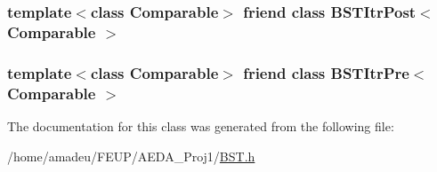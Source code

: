 \subsubsection[{\texorpdfstring{B\+S\+T\+Itr\+Post$<$ Comparable $>$}{BSTItrPost< Comparable >}}]{\setlength{\rightskip}{0pt plus 5cm}template$<$class Comparable$>$ friend class {\bf B\+S\+T\+Itr\+Post}$<$ Comparable $>$\hspace{0.3cm}{\ttfamily [friend]}}\hypertarget{classBST_a5dc153694be266f6e772659486219da7}{}\label{classBST_a5dc153694be266f6e772659486219da7}
\subsubsection[{\texorpdfstring{B\+S\+T\+Itr\+Pre$<$ Comparable $>$}{BSTItrPre< Comparable >}}]{\setlength{\rightskip}{0pt plus 5cm}template$<$class Comparable$>$ friend class {\bf B\+S\+T\+Itr\+Pre}$<$ Comparable $>$\hspace{0.3cm}{\ttfamily [friend]}}\hypertarget{classBST_a45a55df6f11541416d4ea7684c575c1a}{}\label{classBST_a45a55df6f11541416d4ea7684c575c1a}


The documentation for this class was generated from the following file\+:\begin{DoxyCompactItemize}
\item 
/home/amadeu/\+F\+E\+U\+P/\+A\+E\+D\+A\+\_\+\+Proj1/\hyperlink{BST_8h}{B\+S\+T.\+h}\end{DoxyCompactItemize}
